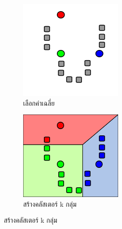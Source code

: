 \begin{figure}[htbp]
    \centering
    \begin{subfigure}{0.5\textwidth}
        \centering
        \includegraphics[width=0.9\linewidth]{fig/k-means-step1.png}
        \caption{เลือกค่าเฉลี่ย}
        \label{fig:k_means_step1}
    \end{subfigure}%
    \begin{subfigure}{0.5\textwidth}
        \centering
        \includegraphics[width=0.9\linewidth]{fig/k-means-step2.png}
        \caption{สร้างคลัสเตอร์ k กลุ่ม}

\end{subfigure}
\end{figure}
